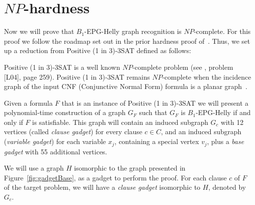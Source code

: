 \documentclass[runningheads]{llncs}
\begin{document}
\section{$NP$-hardness}\label{sec:sectionDispositivoClausula}

Now we will prove that  $B_1$-EPG-Helly graph recognition is $NP$-complete. For this proof we follow the roadmap set out in the prior hardness proof of~\cite{heldt2014}. Thus, we set up a reduction from {\sc Positive (1 in 3)-3SAT} defined  as follows:






{\sc Positive (1 in 3)-3SAT } is a well known $NP$-complete problem (see \cite{johnson1979}, problem [L04], page 259). {\sc Positive (1 in 3)-3SAT} remains $NP$-complete when the incidence graph of the input CNF (Conjunctive Normal Form) formula is a planar graph~\cite{mulzer2008minimum}.

Given a formula $F$ that is an instance of {\sc Positive (1 in 3)-3SAT} we will present a polynomial-time construction of a graph $ G_F$ such that $ G_F $ is $ B_1$-EPG-Helly if and only if $ F $ is satisfiable. This graph will contain an induced subgraph $ G_c$ with 12 vertices (called \emph {clause gadget}) for every clause $ c \in C $, and an induced subgraph (\emph {variable gadget}) for each variable $ x_j$, containing a special vertex  $ v_j$, plus a \emph{base gadget}  with 55 additional vertices.

We will use a graph $H$ isomorphic to the graph presented in Figure~\ref{fig:gadgetBase}, as a gadget to perform the proof. For each clause $c$ of $F$ of the target problem, we will have a \emph{clause gadget} isomorphic to $H$, denoted by $G_c$. %
\vspace{-0.5cm}
 \vspace{-0.5cm}

\end{document}
